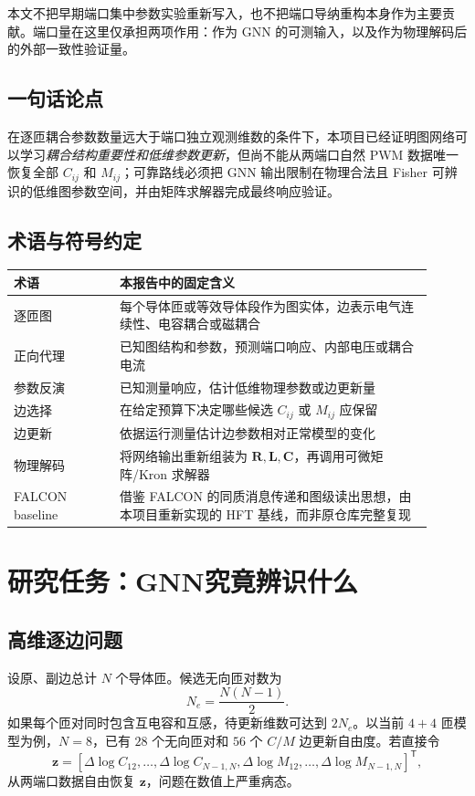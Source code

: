 \documentclass[UTF8,11pt,a4paper]{ctexart}
\newcommand{\mat}[1]{\bm{#1}}
\newcommand{\vect}[1]{\bm{#1}}
\begin{document}
本文不把早期端口集中参数实验重新写入，也不把端口导纳重构本身作为主要贡献。端口量在这里仅承担两项作用：作为 GNN 的可测输入，以及作为物理解码后的外部一致性验证量。

\subsection{一句话论点}
在逐匝耦合参数数量远大于端口独立观测维数的条件下，本项目已经证明图网络可以学习\emph{耦合结构重要性和低维参数更新}，但尚不能从两端口自然 PWM 数据唯一恢复全部 $C_{ij}$ 和 $M_{ij}$；可靠路线必须把 GNN 输出限制在物理合法且 Fisher 可辨识的低维图参数空间，并由矩阵求解器完成最终响应验证。

\subsection{术语与符号约定}
\begin{longtable}{p{0.23\linewidth}p{0.68\linewidth}}
\toprule
术语 & 本报告中的固定含义\\
\midrule
逐匝图 & 每个导体匝或等效导体段作为图实体，边表示电气连续性、电容耦合或磁耦合\\
正向代理 & 已知图结构和参数，预测端口响应、内部电压或耦合电流\\
参数反演 & 已知测量响应，估计低维物理参数或边更新量\\
边选择 & 在给定预算下决定哪些候选 $C_{ij}$ 或 $M_{ij}$ 应保留\\
边更新 & 依据运行测量估计边参数相对正常模型的变化\\
物理解码 & 将网络输出重新组装为 $\mat R,\mat L,\mat C$，再调用可微矩阵/Kron 求解器\\
FALCON baseline & 借鉴 FALCON 的同质消息传递和图级读出思想，由本项目重新实现的 HFT 基线，而非原仓库完整复现\\
\bottomrule
\end{longtable}

\section{研究任务：GNN究竟辨识什么}

\subsection{高维逐边问题}
设原、副边总计 $N$ 个导体匝。候选无向匝对数为
\begin{equation}
N_e=\frac{N(N-1)}{2}.
\end{equation}
如果每个匝对同时包含互电容和互感，待更新维数可达到 $2N_e$。以当前 $4+4$ 匝模型为例，$N=8$，已有 $28$ 个无向匝对和 $56$ 个 $C/M$ 边更新自由度。若直接令
\begin{equation}
\vect z=[\Delta\log C_{12},\ldots,\Delta\log C_{N-1,N},
\Delta\log M_{12},\ldots,\Delta\log M_{N-1,N}]^{\mathsf T},
\end{equation}
从两端口数据自由恢复 $\vect z$，问题在数值上严重病态。
\end{document}
